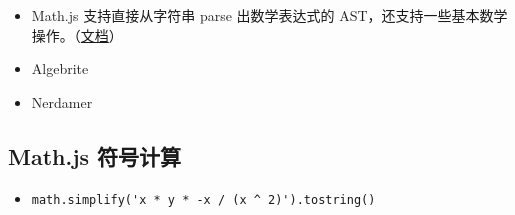
\begin{itemize}
\item Math.js 支持直接从字符串 parse 出数学表达式的 AST，还支持一些基本数学操作。（\href{https://mathjs.org/docs/expressions/algebra.html}{文档}）
\item Algebrite
\item Nerdamer
\end{itemize}

\subsection{Math.js 符号计算}
\begin{itemize}
\item \verb`math.simplify('x * y * -x / (x ^ 2)').tostring()`
\end{itemize}
